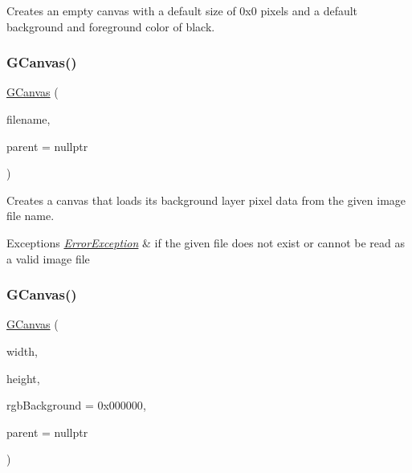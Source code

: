 Creates an empty canvas with a default size of 0x0 pixels and a default background and foreground color of black. 

\mbox{\label{classGCanvas_a0a9de139286d0fc9146928aff8f0538c}} 
\subsubsection{\texorpdfstring{G\+Canvas()}{GCanvas()}\hspace{0.1cm}{\footnotesize\ttfamily [2/4]}}
{\footnotesize\ttfamily \mbox{\hyperlink{classGCanvas}{G\+Canvas}} (\begin{DoxyParamCaption}\item[{const std\+::string \&}]{filename,  }\item[{Q\+Widget $\ast$}]{parent = {\ttfamily nullptr} }\end{DoxyParamCaption})}



Creates a canvas that loads its background layer pixel data from the given image file name. 


\begin{DoxyExceptions}{Exceptions}
{\em \mbox{\hyperlink{classErrorException}{Error\+Exception}}} & if the given file does not exist or cannot be read as a valid image file \\
\hline
\end{DoxyExceptions}
\mbox{\label{classGCanvas_a43d162947a216bef2c35eeaed9c7b88f}} 
\subsubsection{\texorpdfstring{G\+Canvas()}{GCanvas()}\hspace{0.1cm}{\footnotesize\ttfamily [3/4]}}
{\footnotesize\ttfamily \mbox{\hyperlink{classGCanvas}{G\+Canvas}} (\begin{DoxyParamCaption}\item[{double}]{width,  }\item[{double}]{height,  }\item[{int}]{rgb\+Background = {\ttfamily 0x000000},  }\item[{Q\+Widget $\ast$}]{parent = {\ttfamily nullptr} }\end{DoxyParamCaption})}



